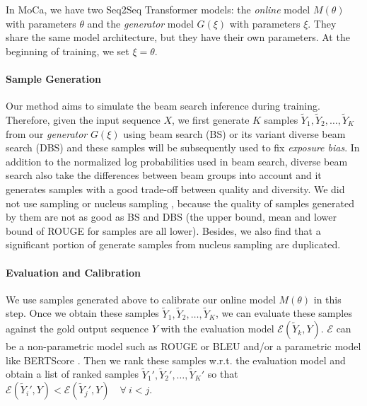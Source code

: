 \documentclass{article}
\begin{document}
In MoCa, we have two Seq2Seq Transformer models: the \emph{online} model $M(\theta)$ with parameters $\theta$ and the \mbox{\emph{generator}} model $G(\xi)$ with parameters $\xi$. They share the same model architecture, but they have their own parameters. At the beginning of training, we set $\xi = \theta$.

\paragraph{Sample Generation} Our method aims to simulate the beam search inference during training. Therefore, given the input sequence $X$, we first generate $K$ samples $\tilde{Y}_1, \tilde{Y}_2, \dots, \tilde{Y}_K$ from our \mbox{\emph{generator}} $G(\xi)$ using beam search (BS) or its variant diverse beam search (DBS) \cite{vijayakumar:2016:arxiv} and these samples will be subsequently used to fix \emph{exposure bias}. In addition to the normalized log probabilities used in beam search, diverse beam search also take the differences between beam groups into account and it generates samples with a good trade-off between quality and diversity. We did not use sampling or nucleus sampling \cite{holtzman:2019:arxiv}, because the quality of samples generated by them are not as good as BS and DBS (the upper bound, mean and lower bound of ROUGE for samples are all lower). Besides, we also find that a significant portion of generate samples from nucleus sampling are duplicated. 

\paragraph{Evaluation and Calibration} We use samples generated above to calibrate our online model $M(\theta)$ in this step. Once we obtain these samples $\tilde{Y}_1, \tilde{Y}_2, \dots, \tilde{Y}_K$, we can evaluate these samples against the gold output sequence $Y$ with the evaluation model $\mathcal{E}(\tilde{Y}_k, Y)$. $\mathcal{E}$ can be a non-parametric model such as ROUGE \cite{lin-2004-rouge} or BLEU \cite{papineni-etal-2002-bleu} and/or a parametric model like BERTScore \cite{zhang2019bertscore}. Then we rank these samples w.r.t. the evaluation model and obtain a list of ranked samples $\tilde{Y}_1', \tilde{Y}_2', \dots, \tilde{Y}_K'$ so that $\mathcal{E}(\tilde{Y}_i', Y) < \mathcal{E}(\tilde{Y}_j', Y) \quad \forall \: i < j$.
\end{document}
